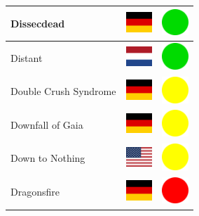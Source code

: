 \documentclass[12pt, a4paper, twoside]{report}
\begin{document}
\begin{center}
\begin{longtable}{|p{5cm}|p{2cm}|p{2cm}|}
Dissecdead & \includegraphics[width=1cm]{4x3/de} & \includegraphics[width=1cm]{likes/y} \\ \hline
Distant & \includegraphics[width=1cm]{4x3/nl} & \includegraphics[width=1cm]{likes/y} \\ \hline
Double Crush Syndrome & \includegraphics[width=1cm]{4x3/de} & \includegraphics[width=1cm]{likes/m} \\ \hline
Downfall of Gaia & \includegraphics[width=1cm]{4x3/de} & \includegraphics[width=1cm]{likes/m} \\ \hline
Down to Nothing & \includegraphics[width=1cm]{4x3/us} & \includegraphics[width=1cm]{likes/m} \\ \hline
Dragonsfire & \includegraphics[width=1cm]{4x3/de} & \includegraphics[width=1cm]{likes/n} \\ \hline

\end{longtable}
\end{center}
\end{document}

